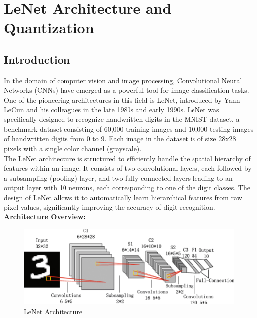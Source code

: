 
\chapter{LeNet Architecture and  Quantization}\doublespacing %

\label{Chapter2} %


\section{Introduction}
In the domain of computer vision and image processing, Convolutional Neural Networks (CNNs) have emerged as a powerful tool for image classification tasks. One of the pioneering architectures in this field is LeNet, introduced by Yann LeCun and his colleagues in the late 1980s and early 1990s. LeNet was specifically designed to recognize handwritten digits in the MNIST dataset, a benchmark dataset consisting of 60,000 training images and 10,000 testing images of handwritten digits from 0 to 9. Each image in the dataset is of size 28x28 pixels with a single color channel (grayscale).
\\
The LeNet architecture is structured to efficiently handle the spatial hierarchy of features within an image. It consists of two convolutional layers, each followed by a subsampling (pooling) layer, and two fully connected layers leading to an output layer with 10 neurons, each corresponding to one of the digit classes. The design of LeNet allows it to automatically learn hierarchical features from raw pixel values, significantly improving the accuracy of digit recognition.
\\
\textbf{Architecture Overview:}
\begin{figure}[h]
    \centering
    \includegraphics[width=\linewidth]{../figures/lenet.png}
    \caption{LeNet Architecture}
\end{figure}

